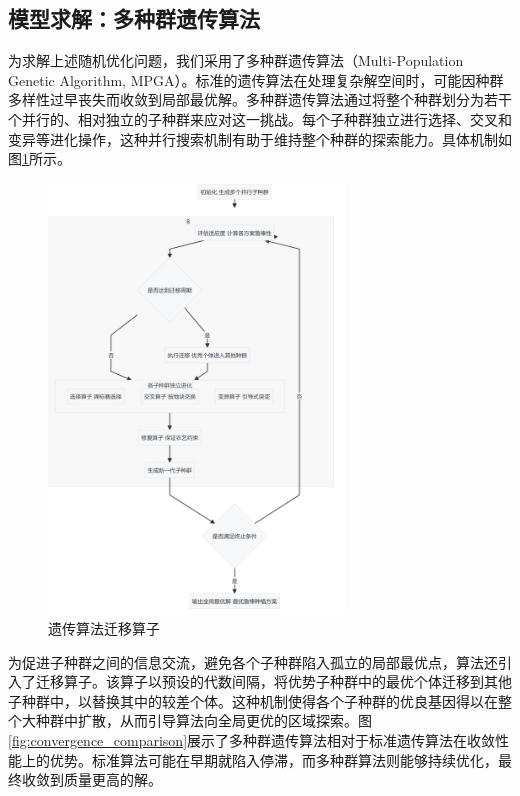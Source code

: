 \subsection{模型求解：多种群遗传算法}
为求解上述随机优化问题，我们采用了多种群遗传算法（Multi-Population Genetic Algorithm, MPGA）\cite{QLJV202403012}。标准的遗传算法在处理复杂解空间时，可能因种群多样性过早丧失而收敛到局部最优解。多种群遗传算法通过将整个种群划分为若干个并行的、相对独立的子种群来应对这一挑战。每个子种群独立进行选择、交叉和变异等进化操作，这种并行搜索机制有助于维持整个种群的探索能力。具体机制如图\ref{fig:transfer_operator}所示。

\begin{figure}[H]
	\centering
	\includegraphics[width=0.7\textwidth]{figs/4问题二/多种群遗传算法.png}
	\caption{遗传算法迁移算子}
	\label{fig:transfer_operator}
\end{figure}



为促进子种群之间的信息交流，避免各个子种群陷入孤立的局部最优点，算法还引入了迁移算子。该算子以预设的代数间隔，将优势子种群中的最优个体迁移到其他子种群中，以替换其中的较差个体。这种机制使得各个子种群的优良基因得以在整个大种群中扩散，从而引导算法向全局更优的区域探索。图\ref{fig:convergence_comparison}展示了多种群遗传算法相对于标准遗传算法在收敛性能上的优势。标准算法可能在早期就陷入停滞，而多种群算法则能够持续优化，最终收敛到质量更高的解。


